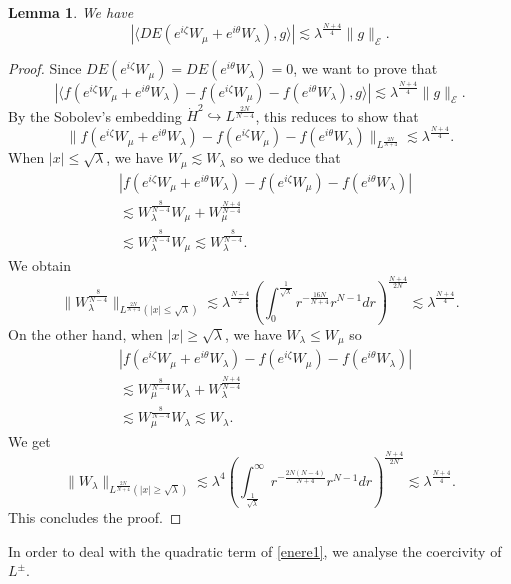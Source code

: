 \documentclass[a4paper,two-side,10pt]{amsart}
\newtheorem{lem}{Lemma}[section]
\numberwithin{equation}{section}
\begin{document}
\begin{lem}
\label{lemener2}
We have
$$|\langle DE (e^{i\zeta} W_\mu + e^{i\theta} W_\lambda),g \rangle| \lesssim \lambda^{\frac{N+4}{4}} \|g\|_{\mathcal{E}} .$$
\end{lem}

\begin{proof}
Since $DE (e^{i \zeta} W_\mu) = DE (e^{i\theta} W_\lambda)=0$, we want to prove that
$$|\langle f(e^{i\zeta} W_\mu + e^{i\theta} W_\lambda) - f( e^{i\zeta} W_\mu ) -f( e^{i\theta} W_\lambda) ,g \rangle | \lesssim \lambda^{\frac{N+4}{4}} \|g\|_{\mathcal{E}}. $$
By the Sobolev's embedding $\dot{H}^{2} \hookrightarrow
L^{\frac{2N}{N-4}} $, this reduces to show that
$$ \| f(e^{i\zeta} W_\mu + e^{i\theta} W_\lambda) - f( e^{i\zeta} W_\mu ) -f( e^{i\theta} W_\lambda) \|_{L^{\frac{2N}{N+4}}} \lesssim \lambda^{\frac{N+4}{4}} .$$
When $|x|\leq \sqrt{\lambda}$, we have $W_\mu \lesssim W_\lambda$ so we deduce that
\begin{align*}
&| f(e^{i\zeta} W_\mu + e^{i\theta} W_\lambda) - f( e^{i\zeta} W_\mu ) -f( e^{i\theta} W_\lambda)| \\
&\lesssim  W_\lambda^{\frac{8}{N-4}} W_\mu +W_\mu^{\frac{N+4}{N-4}}\\
& \lesssim   W_\lambda^{\frac{8}{N-4}} W_\mu \lesssim W_\lambda^{\frac{8}{N-4}}. 
\end{align*}
We obtain
$$\|W_\lambda^{\frac{8}{N-4}} \|_{L^{\frac{2N}{N+4}} (|x|\leq \sqrt{\lambda}) } \lesssim \lambda^{\frac{N-4}{2}} \left(\int_0^{\frac{1}{\sqrt{\lambda}}} r^{-\frac{16N }{N+4}}  r^{N-1} dr\right)^{\frac{N+4}{2N}} \lesssim \lambda^{\frac{N+4}{4}} .$$
On the other hand, when $|x|\geq \sqrt{\lambda}$, we have $W_\lambda \leq W_\mu$ so
\begin{align*}
&| f(e^{i\zeta} W_\mu + e^{i\theta} W_\lambda) - f( e^{i\zeta} W_\mu ) -f( e^{i\theta} W_\lambda)|\\
& \lesssim  W_\mu^{\frac{8}{N-4}} W_\lambda +W_\lambda^{\frac{N+4}{N-4}}\\
& \lesssim  W_\mu^{\frac{8}{N-4}} W_\lambda \lesssim W_\lambda. 
\end{align*}
We get
$$\|W_\lambda\|_{L^{\frac{2N}{N+4} } (|x|\geq \sqrt{\lambda}) } \lesssim \lambda^4  \left(\int_{\frac{1}{\sqrt{\lambda}}}^\infty r^{- \frac{2N (N-4)}{N+4}}  r^{N-1}dr \right)^{\frac{N+4}{2N}} \lesssim \lambda^{\frac{N+4}{4}}. $$
This concludes the proof.
\end{proof}


In order to deal with the quadratic term of \eqref{enere1}, we analyse the coercivity of $L^\pm$.
\end{document}
